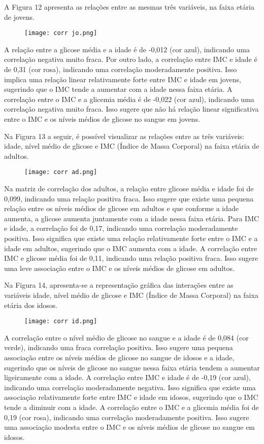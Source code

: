 \documentclass[conference]{IEEEtran}
\begin{document}
A Figura 12 apresenta as relações entre as mesmas três variáveis, na faixa etária de jovens. 
\begin{figure}[H]
   \caption{}
   \centering
   \texttt{[image: corr jo.png]}
\end{figure}
A relação entre a glicose média e a idade é de -0,012 (cor azul), indicando uma correlação negativa muito fraca. Por outro lado, a correlação entre IMC e idade é de 0,31 (cor rosa), indicando uma correlação moderadamente positiva. Isso implica uma relação linear relativamente forte entre IMC e idade em jovens, sugerindo que o IMC tende a aumentar com a idade nessa faixa etária. A correlação entre o IMC e a glicemia média é de -0,022 (cor azul), indicando uma correlação negativa muito fraca. Isso sugere que não há relação linear significativa entre o IMC e os níveis médios de glicose no sangue em jovens.

Na Figura 13 a seguir, é possível visualizar as relações entre as três variáveis: idade, nível médio de glicose e IMC (Índice de Massa Corporal) na faixa etária de adultos.
\begin{figure}[H]
   \caption{}
   \centering
   \texttt{[image: corr ad.png]}
\end{figure}
Na matriz de correlação dos adultos, a relação entre glicose média e idade foi de 0,099, indicando uma relação positiva fraca. Isso sugere que existe uma pequena relação entre os níveis médios de glicose em adultos e que conforme a idade aumenta, a glicose aumenta juntamente com a idade nessa faixa etária. Para IMC e idade, a correlação foi de 0,17, indicando uma correlação moderadamente positiva. Isso significa que existe uma relação relativamente forte entre o IMC e a idade em adultos, sugerindo que o IMC aumenta com a idade. A correlação entre IMC e glicose média foi de 0,11, indicando uma relação positiva fraca. Isso sugere uma leve associação entre o IMC e os níveis médios de glicose em adultos.

Na Figura 14, apresenta-se a representação gráfica das interações entre as variáveis idade, nível médio de glicose e IMC (Índice de Massa Corporal) na faixa etária dos idosos.
\begin{figure}[H]
   \caption{}
   \centering
   \texttt{[image: corr id.png]}
\end{figure}
A correlação entre o nível médio de glicose no sangue e a idade é de 0,084 (cor verde), indicando uma fraca correlação positiva. Isso sugere uma pequena associação entre os níveis médios de glicose no sangue de idosos e a idade, sugerindo que os níveis de glicose no sangue nessa faixa etária tendem a aumentar ligeiramente com a idade. A correlação entre IMC e idade é de -0,19 (cor azul), indicando uma correlação moderadamente negativa. Isso significa que existe uma associação relativamente forte entre IMC e idade em idosos, sugerindo que o IMC tende a diminuir com a idade. A correlação entre o IMC e a glicemia média foi de 0,19 (cor rosa), indicando uma correlação moderadamente positiva. Isso sugere uma associação modesta entre o IMC e os níveis médios de glicose no sangue em idosos. \\
\end{document}
